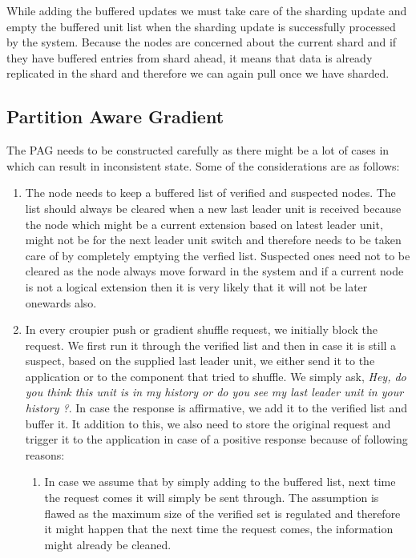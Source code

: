 \documentclass[a4paper, 11pt]{article}
\begin{document}
While adding the buffered updates we must take care of the sharding update and empty the buffered unit list when the sharding update is successfully processed by the system. Because the nodes are concerned about the current shard and if they have buffered entries from shard ahead, it means that data is already replicated in the shard and therefore we can again pull once we have sharded. 


\subsection{Partition Aware Gradient}
The PAG needs to be constructed carefully as there might be a lot of cases in which can result in inconsistent state. Some of the considerations are as follows:

\begin{enumerate}

\item The node needs to keep a buffered list of verified and suspected nodes. The list should always be cleared when a new last leader unit is received because the node which might be a current extension based on latest leader unit, might not be for the next leader unit switch and therefore needs to be taken care of by completely emptying the verfied list. Suspected ones need not to be cleared as the node always move forward in the system and if a current node is not a logical extension then it is very likely that it will not be later onewards also.


\item In every croupier push or gradient shuffle request, we initially block the request. We first run it through the verified list and then in case it is still a suspect, based on the supplied last leader unit, we either send it to the application or to the component that tried to shuffle. We simply ask, \textit{Hey, do you think this unit is in my history or do you see my last leader unit in your history ?}. In case the response is affirmative, we add it to the verified list and buffer it. It addition to this, we also need to store the original request and trigger it to the application in case of a positive response because of following reasons:

\begin{enumerate}

\item In case we assume that by simply adding to the buffered list, next time the request comes it will simply be sent through. The assumption is flawed as the maximum size of the verified set is regulated and therefore it might happen that the next time the request comes, the information might already be cleaned.


\end{enumerate}
\end{enumerate}
\end{document}
